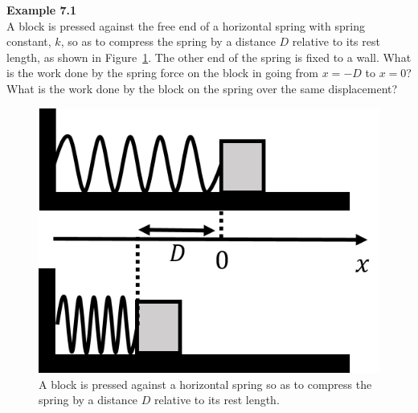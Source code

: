 \begin{framed}
\textbf{Example 7.1}\\
A block is pressed against the free end of a horizontal spring with spring constant, $k$, so as to compress the spring by a distance $D$ relative to its rest length, as shown in Figure~\ref{fig:workenergy:spring}. The other end of the spring is fixed to a wall. What is the work done by the spring force on the block in going from $x= -D$ to $x=0$? What is the work done by the block on the spring over the same displacement?

\begin{figure}[!htbp]
\centering
\includegraphics[width=0.4\linewidth]{files/spring-fb0b7b45895ba1ffc941557cc6a32aee.png}
\caption[]{A block is pressed against a horizontal spring so as to compress the spring by a distance $D$ relative to its rest length.}
\label{fig:workenergy:spring}
\end{figure}


\end{framed}
